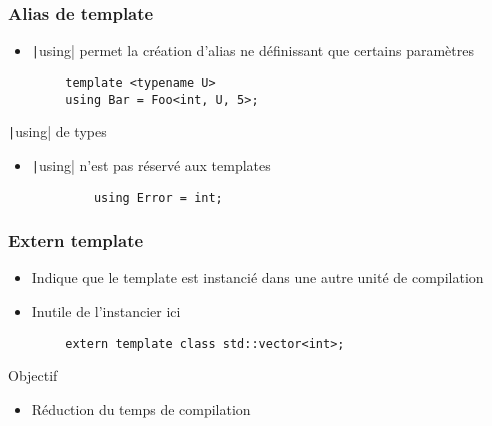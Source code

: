 \documentclass[C++.tex]{subfiles}
\begin{document}
\begin{frame}[fragile]
	\frametitle{Alias de template}
	\begin{itemize}
		\item \texttt|using| permet la création d'alias ne définissant que certains paramètres
	\end{itemize}

	\begin{verbatim}
		template <typename U>
		using Bar = Foo<int, U, 5>;
	\end{verbatim}

	\begin{block}{\texttt|using| de types}
		\begin{itemize}
			\item \texttt|using| n'est pas réservé aux templates
		\end{itemize}

		\begin{verbatim}
			using Error = int;
		\end{verbatim}

	\end{block}
\end{frame}

\begin{frame}[fragile]
	\frametitle{Extern template}
	\begin{itemize}
		\item Indique que le template est instancié dans une autre unité de compilation
		\item Inutile de l'instancier ici
	\end{itemize}

	\begin{verbatim}
		extern template class std::vector<int>;
	\end{verbatim}

	\begin{block}{Objectif}
		\begin{itemize}
			\item Réduction du temps de compilation
		\end{itemize}
	\end{block}
\end{frame}
\end{document}
